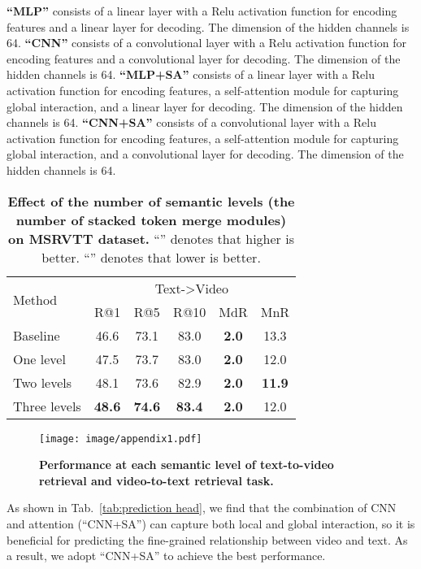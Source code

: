 \documentclass[10pt,twocolumn,letterpaper]{article}
\newcommand{\tabfootnotesize}{\fontsize{8}{9}\selectfont}
\begin{document}
{\textbf{``MLP''} consists of a linear layer with a Relu activation function for encoding features and a linear layer for decoding. The dimension of the hidden channels is 64.
\textbf{``CNN''} consists of a convolutional layer with a Relu activation function for encoding features and a convolutional layer for decoding. The dimension of the hidden channels is 64.
\textbf{``MLP+SA''} consists of a linear layer with a Relu activation function for encoding features, a self-attention module for capturing global interaction, and a linear layer for decoding. The dimension of the hidden channels is 64.
\textbf{``CNN+SA''} consists of a convolutional layer with a Relu activation function for encoding features, a self-attention module for capturing global interaction, and a convolutional layer for decoding. The dimension of the hidden channels is 64.

\begin{table}[tb]
\tabfootnotesize
\centering
\setlength{\tabcolsep}{5.2pt}
\begin{tabular}{lccccc}
\toprule[1.25pt]
\multirow{2}{*}{Method} & \multicolumn{5}{c}{{Text-\textgreater{}Video}}\\
\cline{2-6}
  & R@1 & R@5 & R@10 & MdR & MnR \\
 \midrule
Baseline & 46.6 & 73.1 & 83.0 & \textbf{2.0} &  13.3\\
\midrule
One level & 47.5 & 73.7 & 83.0 & \textbf{2.0} & 12.0\\
Two levels & 48.1 & 73.6 & 82.9 & \textbf{2.0} & \textbf{11.9}\\
\rowcolor{aliceblue!60} Three levels & \textbf{48.6} & \textbf{74.6} & \textbf{83.4} & \textbf{2.0} & 12.0\\
\bottomrule[1.25pt]
\end{tabular}
\caption{\textbf{Effect of the number of semantic levels (the number of stacked token merge modules) on MSRVTT dataset.} ``'' denotes that higher is better. ``'' denotes that lower is better.}
\label{tab:num}
\end{table}

\begin{figure}[tbp]
\centering
\texttt{[image: image/appendix1.pdf]}
\caption{\textbf{Performance at each semantic level of text-to-video retrieval and video-to-text retrieval task.}}
\label{fig:self}
\end{figure}

As shown in Tab.~\ref{tab:prediction head}, we find that the combination of CNN and attention (``CNN+SA'') can capture both local and global interaction, so it is beneficial for predicting the fine-grained relationship between video and text. As a result, we adopt ``CNN+SA'' to achieve the best performance.

}
\end{document}
